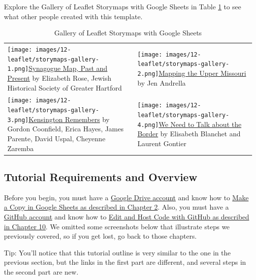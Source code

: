 \documentclass[
  english,
]{book}
\begin{document}
Explore the Gallery of Leaflet Storymaps with Google Sheets in Table \ref{tab:storymaps-gallery} to see what other people created with this template.

\begin{longtable}[]{@{}
  >{\raggedright\arraybackslash}p{}
  >{\raggedright\arraybackslash}p{}@{}}
\caption{\label{tab:storymaps-gallery} Gallery of Leaflet Storymaps with Google Sheets}\tabularnewline
\toprule
\endhead
\texttt{[image: images/12-leaflet/storymaps-gallery-1.png]}\href{https://jhsgh.org/synagogue-map/}{Synagogue Map, Past and Present} by Elizabeth Rose, Jewish Historical Society of Greater Hartford & \texttt{[image: images/12-leaflet/storymaps-gallery-2.png]}\href{https://www.mappingtheuppermissouri.com/}{Mapping the Upper Missouri} by Jen Andrella \\
\texttt{[image: images/12-leaflet/storymaps-gallery-3.png]}\href{https://kensingtonremembers.org}{Kensington Remembers} by Gordon Coonfield, Erica Hayes, James Parente, David Uspal, Cheyenne Zaremba & \texttt{[image: images/12-leaflet/storymaps-gallery-4.png]}\href{https://www.weneedtotalkabouttheborder.eu}{We Need to Talk about the Border} by Elisabeth Blanchet and Laurent Gontier \\
\bottomrule
\end{longtable}

\hypertarget{tutorial-requirements-and-overview-1}{%
\subsection*{Tutorial Requirements and Overview}\label{tutorial-requirements-and-overview-1}}

Before you begin, you must have a \href{https://drive.google.com}{Google Drive account} and know how to \href{copy.html}{Make a Copy in Google Sheets as described in Chapter 2}. Also, you must have a \href{https://github.com}{GitHub account} and know how to \href{github.html}{Edit and Host Code with GitHub as described in Chapter 10}. We omitted some screenshots below that illustrate steps we previously covered, so if you get lost, go back to those chapters.

Tip: You'll notice that this tutorial outline is very similar to the one in the previous section, but the links in the first part are different, and several steps in the second part are new.
\end{document}
